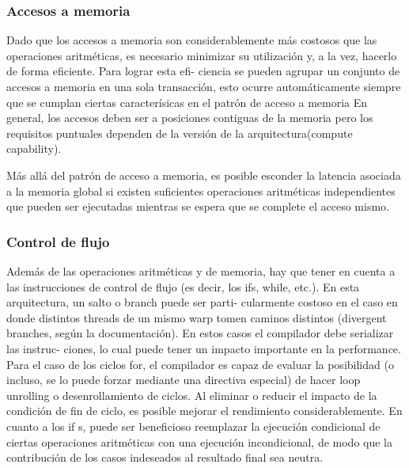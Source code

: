 \documentclass[a4paper,10pt]{report}
\begin{document}
\subsubsection{Accesos a memoria}
Dado que los accesos a memoria son considerablemente más costosos que las operaciones aritméticas, es necesario minimizar su utilización y, a la vez, hacerlo de forma eficiente. Para lograr esta efi-
ciencia se pueden agrupar un conjunto de accesos a memoria en una sola transacción, esto ocurre automáticamente siempre que se cumplan ciertas caracterísicas en el patrón de acceso a memoria
En general, los accesos deben ser a posiciones contiguas de la memoria pero los requisitos puntuales dependen de la versión de la arquitectura(compute capability). 



% 

Más allá del patrón de acceso a memoria, es posible esconder la latencia asociada a la memoria
global si existen suficientes operaciones aritméticas independientes que pueden ser ejecutadas mientras
se espera que se complete el acceso mismo.


\subsubsection{Control de flujo}

Además de las operaciones aritméticas y de memoria, hay que tener en cuenta a las instrucciones
de control de flujo (es decir, los ifs, while, etc.). En esta arquitectura, un salto o branch puede ser parti-
cularmente costoso en el caso en donde distintos threads de un mismo warp tomen caminos distintos
(divergent branches, según la documentación). En estos casos el compilador debe serializar las instruc-
ciones, lo cual puede tener un impacto importante en la performance.
Para el caso de los ciclos for, el compilador es capaz de evaluar la posibilidad (o incluso, se lo puede
forzar mediante una directiva especial) de hacer loop unrolling o desenrollamiento de ciclos. Al eliminar o
reducir el impacto de la condición de fin de ciclo, es posible mejorar el rendimiento considerablemente.
En cuanto a los if s, puede ser beneficioso reemplazar la ejecución condicional de ciertas operaciones
aritméticas con una ejecución incondicional, de modo que la contribución de los casos indeseados al
resultado final sea neutra.
\end{document}
